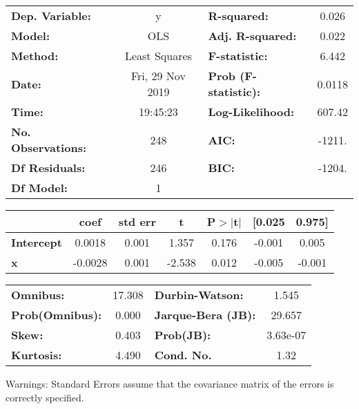 \documentclass{report}
\begin{document}
\begin{center}
\begin{tabular}{lclc}
\toprule
\textbf{Dep. Variable:}    &        y         & \textbf{  R-squared:         } &     0.026   \\
\textbf{Model:}            &       OLS        & \textbf{  Adj. R-squared:    } &     0.022   \\
\textbf{Method:}           &  Least Squares   & \textbf{  F-statistic:       } &     6.442   \\
\textbf{Date:}             & Fri, 29 Nov 2019 & \textbf{  Prob (F-statistic):} &   0.0118    \\
\textbf{Time:}             &     19:45:23     & \textbf{  Log-Likelihood:    } &    607.42   \\
\textbf{No. Observations:} &         248      & \textbf{  AIC:               } &    -1211.   \\
\textbf{Df Residuals:}     &         246      & \textbf{  BIC:               } &    -1204.   \\
\textbf{Df Model:}         &           1      & \textbf{                     } &             \\
\bottomrule
\end{tabular}
\begin{tabular}{lcccccc}
                   & \textbf{coef} & \textbf{std err} & \textbf{t} & \textbf{P$>$$|$t$|$} & \textbf{[0.025} & \textbf{0.975]}  \\
\midrule
\textbf{Intercept} &       0.0018  &        0.001     &     1.357  &         0.176        &       -0.001    &        0.005     \\
\textbf{x}         &      -0.0028  &        0.001     &    -2.538  &         0.012        &       -0.005    &       -0.001     \\
\bottomrule
\end{tabular}
\begin{tabular}{lclc}
\textbf{Omnibus:}       & 17.308 & \textbf{  Durbin-Watson:     } &    1.545  \\
\textbf{Prob(Omnibus):} &  0.000 & \textbf{  Jarque-Bera (JB):  } &   29.657  \\
\textbf{Skew:}          &  0.403 & \textbf{  Prob(JB):          } & 3.63e-07  \\
\textbf{Kurtosis:}      &  4.490 & \textbf{  Cond. No.          } &     1.32  \\
\bottomrule
\end{tabular}
\end{center}

Warnings: \newline
 [1] Standard Errors assume that the covariance matrix of the errors is correctly specified.
\end{document}
